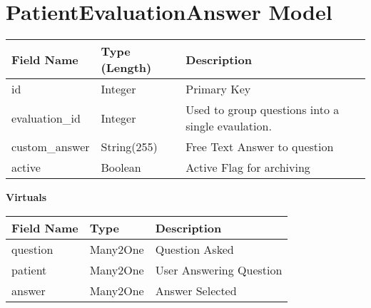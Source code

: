 \documentclass[letterpaper,10pt,english]{sphinxmanual}
\begin{document}
\section{PatientEvaluationAnswer Model}
\label{dev-models:patientevaluationanswer-model-label}\label{dev-models:patientevaluationanswer-model}
\begin{tabulary}{\linewidth}{|L|L|L|}
\hline
\textsf{\relax 
Field Name
} & \textsf{\relax 
Type (Length)
} & \textsf{\relax 
Description
}\\
\hline
id
 & 
Integer
 & 
Primary Key
\\

evaluation\_id
 & 
Integer
 & 
Used to group questions into a single
evaulation.
\\

custom\_answer
 & 
String(255)
 & 
Free Text Answer to question
\\

active
 & 
Boolean
 & 
Active Flag for archiving
\\
\hline\end{tabulary}


\textbf{Virtuals}

\begin{tabulary}{\linewidth}{|L|L|L|}
\hline
\textsf{\relax 
Field Name
} & \textsf{\relax 
Type
} & \textsf{\relax 
Description
}\\
\hline
question
 & 
Many2One
 & 
Question Asked
\\

patient
 & 
Many2One
 & 
User Answering Question
\\

answer
 & 
Many2One
 & 
Answer Selected
\\
\hline\end{tabulary}
\end{document}

